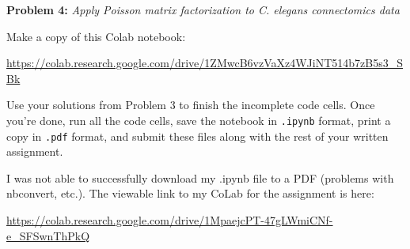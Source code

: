 
\textbf{Problem 4:} \textit{Apply Poisson matrix factorization to C. elegans connectomics data}

Make a copy of this Colab notebook: 

\begin{center}
    \url{https://colab.research.google.com/drive/1ZMwcB6vzVaXz4WJiNT514b7zB5s3_SBk}
\end{center}

Use your solutions from Problem 3 to finish the incomplete code cells. Once you're done, run all the code cells, save the notebook in \texttt{.ipynb} format, print a copy in \texttt{.pdf} format, and submit these files along with the rest of your written assignment.

\begin{solution}
I was not able to successfully download my .ipynb file to a PDF (problems with nbconvert, etc.). The viewable link to my CoLab for the assignment is here:

\begin{center}
	\url{https://colab.research.google.com/drive/1MpaejcPT-47gLWmiCNf-e_SFSwnThPkQ}
\end{center}
\end{solution}
